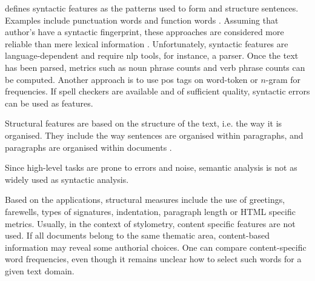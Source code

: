 \citet{elmanarelbouanani_authorship_2014} defines syntactic features as the patterns used to form and structure sentences.
Examples include punctuation words and function words \citep{elmanarelbouanani_authorship_2014}.
Assuming that author's have a syntactic fingerprint, these approaches are considered more reliable than mere lexical information \citep{bevendorff_overview_2024}.
Unfortunately, syntactic features are language-dependent and require \ac{nlp} tools, for instance, a parser.
Once the text has been parsed, metrics such as noun phrase counts and verb phrase counts can be computed.
Another approach is to use \ac{pos} tags on word-token or $n$-gram for frequencies.
If spell checkers are available and of sufficient quality, syntactic errors can be used as features.

Structural features are based on the structure of the text, i.e. the way it is organised.
They include the way sentences are organised within paragraphs, and paragraphs are organised within documents \citep{elmanarelbouanani_authorship_2014}.


Since high-level tasks are prone to errors and noise, semantic analysis is not as widely used as syntactic analysis.


Based on the applications, structural measures include the use of greetings, farewells, types of signatures, indentation, paragraph length 
or HTML specific metrics.
Usually, in the context of stylometry, content specific features are not used.
If all documents belong to the same thematic area, content-based information may reveal some authorial choices. 
One can compare content-specific word frequencies, even though it remains unclear how to select such words for a given text domain.

